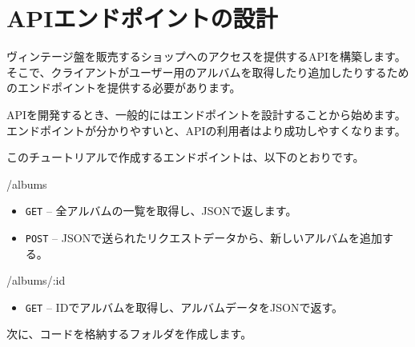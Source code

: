 \section{APIエンドポイントの設計}

ヴィンテージ盤を販売するショップへのアクセスを提供するAPIを構築します。そこで、クライアントがユーザー用のアルバムを取得したり追加したりするためのエンドポイントを提供する必要があります。

APIを開発するとき、一般的にはエンドポイントを設計することから始めます。エンドポイントが分かりやすいと、APIの利用者はより成功しやすくなります。

このチュートリアルで作成するエンドポイントは、以下のとおりです。

/albums

\begin{itemize}
\item
  \texttt{GET} -- 全アルバムの一覧を取得し、JSONで返します。
\item
  \texttt{POST} --
  JSONで送られたリクエストデータから、新しいアルバムを追加する。
\end{itemize}

/albums/:id

\begin{itemize}
\item
  \texttt{GET} -- IDでアルバムを取得し、アルバムデータをJSONで返す。
\end{itemize}

次に、コードを格納するフォルダを作成します。

